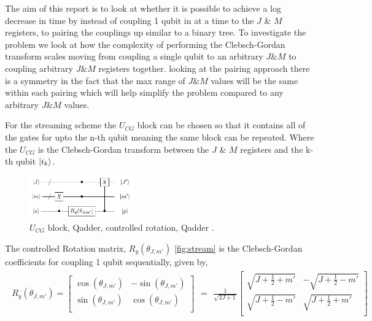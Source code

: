 \documentclass[12pt]{article}
\begin{document}
The aim of this report is to look at whether it is possible to achieve a log decrease in time by instead of coupling 1 qubit in at a time to the $J$ \& $M$ registers, to pairing the couplings up similar to a binary tree. To investigate the problem we look at how the complexity of performing the Clebsch-Gordan transform scales moving from coupling a single qubit to an arbitrary $J \& M$ to coupling arbitrary $J \& M$ registers together. looking at the pairing approach there is a symmetry in the fact that the max range of $J \& M$ values will be the same within each pairing which will help simplify the problem compared to any arbitrary $J \& M$ values.

For the streaming scheme the $U_{CG}$ block can be chosen so that it contains all of the gates for upto the n-th qubit meaning the same block can be repeated. Where the $U_{CG}$ is the Clebsch-Gordan transform between the $J$ \& $M$ registers and the k-th qubit $\left\vert{i_k}\right\rangle$.


\begin{figure}[h!]
\centering
\includegraphics[width=0.4\textwidth]{genaddercirc.png}
\caption{$U_{CG}$ block, Qadder, controlled rotation, Qadder \cite{bacon2006efficient}.}
\label{fig:ucg}
\end{figure}

The controlled Rotation matrix, $R_y(\theta_{J,m'})$ \autoref{fig:stream} is the Clebsch-Gordan coefficients for coupling 1 qubit sequentially, given by,
\begin{align}
\begin{split}
R_y(\theta_{J,m'})=
\begin{bmatrix}
\cos(\theta_{J,m'}) &-\sin(\theta_{J,m'}) \\
\sin(\theta_{J,m'}) & \cos(\theta_{J,m'}) \\
\end{bmatrix}
\end{split}
=
\begin{split}
\frac{1}{\sqrt{2J+1}}
\begin{bmatrix}
\sqrt{J+\frac{1}{2}+m'} &-\sqrt{J+\frac{1}{2}-m'} \\
\sqrt{J+\frac{1}{2}-m'} & \sqrt{J+\frac{1}{2}+m'} \\
\end{bmatrix}
\end{split}
\label{eq:rotmatrix}
\end{align}
\end{document}
